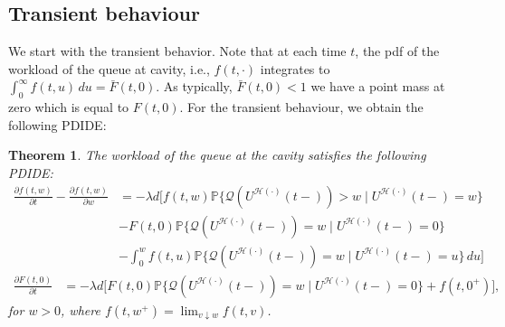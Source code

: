 \documentclass[12pt]{report}
\newtheorem{theorem}{Theorem}
\begin{document}
\subsection{Transient behaviour}\label{sec:transient}
We start with the transient behavior. 
Note that at each time $t$, the pdf of the workload of the queue at cavity, i.e., $f(t,\cdot)$ integrates to $\int_0^{\infty} f(t,u)\, du = \bar F(t,0)$. As typically, $\bar F(t,0) < 1$ we have a point mass at zero which is equal to $F(t,0)$.
 For the transient behaviour, we obtain the following PDIDE:
\begin{theorem} \label{thm:transient}
The workload of the queue at the cavity satisfies the following PDIDE:
\begin{align}
\frac{\partial f(t,w)}{\partial t} - \frac{\partial f(t,w)}{\partial w}&=-\lambda d \bigg[ f(t,w) \mathbb{P}\{\mathcal{Q}(U^{\mathcal{H}(\cdot)}(t-)) > w \mid U^{\mathcal{H}(\cdot)}(t-)=w\} \nonumber\\
&-F(t,0) \mathbb{P}\{ \mathcal{Q}(U^{\mathcal{H}(\cdot)}(t-)) = w \mid U^{\mathcal{H}(\cdot)}(t-)=0\} \nonumber\\
&-\int_0^w f(t,u) \mathbb{P}\{ \mathcal{Q}(U^{\mathcal{H}(\cdot)}(t-))=w \mid U^{\mathcal{H}(\cdot)}(t-)=u\} \, du
\bigg]\label{eq:transient1}
\end{align}
\begin{align}
\frac{\partial F(t,0)}{\partial t} &= -\lambda d \bigg[ F(t,0) \mathbb{P}\{ \mathcal{Q}(U^{\mathcal{H}(\cdot)}(t-)) = w \mid U^{\mathcal{H}(\cdot)}(t-)=0\} + f(t,0^+) \bigg]
, \label{eq:transient2}
\end{align}
for $w>0$, where $f(t,w^+)=\lim_{v \downarrow w} f(t,v)$.
\end{theorem}
\end{document}
